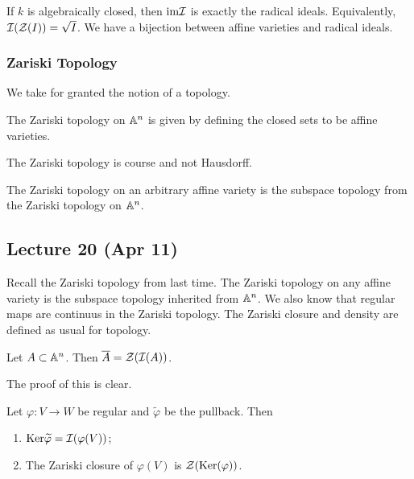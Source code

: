 \documentclass[10pt, twoside]{article}
\begin{document}
    \begin{thm}[Nullstellensatz] If $k$ is algebraically closed, then
    $\mathrm{im} \mathcal{I}$ is exactly the radical ideals. Equivalently,
$\mathcal{I}(\mathcal{Z}(I)) = \sqrt{I}$. We have a bijection between affine varieties
and radical ideals.  \end{thm}

    \subsubsection{Zariski Topology} We take for granted the notion of a
    topology. 

    \begin{defn} The Zariski topology on $\mathbb{A}^n$ is given by defining the closed
        sets to be affine varieties.  \end{defn} \begin{rmk} The Zariski
        topology is course and not Hausdorff.  \end{rmk} \begin{rmk} The
        Zariski topology on an arbitrary affine variety is the subspace
        topology from the Zariski topology on $\mathbb{A}^n$.  \end{rmk}
       
        \subsection{Lecture 20 (Apr 11)} Recall the Zariski topology from last
        time. The Zariski topology on any affine variety is the subspace
        topology inherited from $\mathbb{A}^n$. We also know that regular maps are
        continuus in the Zariski topology. The Zariski closure and density are
        defined as usual for topology.

        \begin{prop} Let $A \subset \mathbb{A}^n$. Then $\overline{A} =
        \mathcal{Z}(\mathcal{I}(A))$.  \end{prop} The proof of this is clear.

        \begin{prop} Let $\varphi:V \to W$ be regular and $\widetilde{\varphi}$
            be the pullback. Then \begin{enumerate} \item $\mathrm{Ker}
                \widetilde{\varphi} = \mathcal{I}(\varphi(V))$; \item The Zariski
                closure of $\varphi(V)$ is $\mathcal{Z}(\mathrm{Ker}(\varphi))$.
        \end{enumerate} \end{prop}
\end{document}
